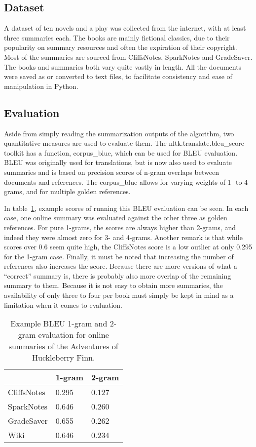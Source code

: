 \subsection{Dataset}
A dataset of ten novels and a play was collected from the internet, with at
least three summaries each. The books are mainly fictional classics, due to
their popularity on summary resources and often the expiration of their
copyright. Most of the summaries are sourced from CliffsNotes, SparkNotes and
GradeSaver. The books and summaries both vary quite vastly in length. All the
documents were saved as or converted to text files, to facilitate consistency
and ease of manipulation in Python.

\subsection{Evaluation}
Aside from simply reading the summarization outputs of the algorithm, two
quantitative measures are used to evaluate them.
The nltk.translate.bleu\_score toolkit has a function, corpus\_blue, which can
be used for BLEU evaluation. BLEU was originally used for translations, but is
now also used to evaluate summaries and is based on precision scores of
n-gram overlaps between documents and references. The corpus\_blue allows for
varying weights of 1- to 4-grams, and for multiple golden references. 

In table~\ref{table:bleu_huckfinn}, example scores of running this BLEU
evaluation can be seen. In each case, one online summary was evaluated against
the other three as golden references. For pure 1-grams, the scores are always
higher than 2-grams, and indeed they were almost zero for 3- and 4-grams.
Another remark is that while scores over 0.6 seem quite high, the CliffsNotes
score is a low outlier at only 0.295 for the 1-gram case. Finally, it must be
noted that increasing the number of references also increases the score.
Because there are more versions of what a ``correct'' summary is, there is
probably also more overlap of the remaining summary to them. Because it is not
easy to obtain more summaries, the availability of only three to four per book
must simply be kept in mind as a limitation when it comes to evaluation.

\begin{table}[H]
	\centering
	\caption{Example BLEU 1-gram and 2-gram evaluation for online summaries of the Adventures of Huckleberry Finn.}\label{table:bleu_huckfinn}
	\begin{tabular}{l l l }
		\toprule
		\textbf{}   & \textbf{1-gram} & \textbf{2-gram} \\ \midrule
		CliffsNotes & 0.295           & 0.127           \\ \midrule
		SparkNotes  & 0.646           & 0.260           \\ \midrule
		GradeSaver  & 0.655           & 0.262           \\ \midrule
		Wiki   & 0.646           & 0.234           \\
		\bottomrule
	\end{tabular}
\end{table}

